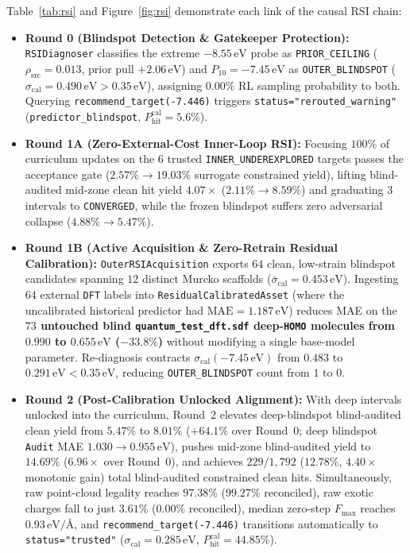 \documentclass[11pt,a4paper]{article}
\begin{document}
Table~\ref{tab:rsi} and Figure~\ref{fig:rsi} demonstrate each link of the causal RSI chain:
\begin{itemize}[leftmargin=1.5em,itemsep=2pt,topsep=2pt]
    \item \textbf{Round 0 (Blindspot Detection \& Gatekeeper Protection):} \texttt{RSIDiagnoser} classifies the extreme $-8.55\,\text{eV}$ probe as \texttt{PRIOR\_CEILING} ($\rho_{\text{src}} = 0.013$, prior pull $+2.06\,\text{eV}$) and $P_{10} = -7.45\,\text{eV}$ as \texttt{OUTER\_BLINDSPOT} ($\sigma_{\text{cal}} = 0.490\,\text{eV} > 0.35\,\text{eV}$), assigning $0.00\%$ RL sampling probability to both. Querying \texttt{recommend\_target(-7.446)} triggers \texttt{status="rerouted\_warning"} (\texttt{predictor\_blindspot}, $P_{\text{hit}}^{\text{cal}} = 5.6\%$).
    \item \textbf{Round 1A (Zero-External-Cost Inner-Loop RSI):} Focusing $100\%$ of curriculum updates on the $6$ trusted \texttt{INNER\_UNDEREXPLORED} targets passes the acceptance gate ($2.57\% \to 19.03\%$ surrogate constrained yield), lifting blind-audited mid-zone clean hit yield $4.07\times$ ($2.11\% \to 8.59\%$) and graduating $3$ intervals to \texttt{CONVERGED}, while the frozen blindspot suffers zero adversarial collapse ($4.88\% \to 5.47\%$).
    \item \textbf{Round 1B (Active Acquisition \& Zero-Retrain Residual Calibration):} \texttt{Outer\allowbreak RSI\allowbreak Acquisition} exports $64$ clean, low-strain blindspot candidates spanning $12$ distinct Murcko scaffolds ($\bar{\sigma}_{\text{cal}} = 0.453\,\text{eV}$). Ingesting $64$ external \texttt{DFT} labels into \texttt{Residual\allowbreak Calibrated\allowbreak Asset} (where the uncalibrated historical predictor had $\text{MAE} = 1.187\,\text{eV}$) reduces MAE on the \textbf{$73$ untouched blind \texttt{quantum\_test\_dft.sdf} deep-\texttt{HOMO} molecules from $0.990$ to $0.655\,\text{eV}$ ($-33.8\%$)} without modifying a single base-model parameter. Re-diagnosis contracts $\sigma_{\text{cal}}(-7.45\,\text{eV})$ from $0.483$ to $0.291\,\text{eV} < 0.35\,\text{eV}$, reducing \texttt{OUTER\_BLINDSPOT} count from $1$ to $0$.
    \item \textbf{Round 2 (Post-Calibration Unlocked Alignment):} With deep intervals unlocked into the curriculum, Round~2 elevates deep-blindspot blind-audited clean yield from $5.47\%$ to $8.01\%$ ($+64.1\%$ over Round~0; deep blindspot \texttt{Audit} MAE $1.030 \to 0.955\,\text{eV}$), pushes mid-zone blind-audited yield to $14.69\%$ ($6.96\times$ over Round~0), and achieves $229 / 1{,}792$ ($12.78\%$, $4.40\times$ monotonic gain) total blind-audited constrained clean hits. Simultaneously, raw point-cloud legality reaches $97.38\%$ ($99.27\%$ reconciled), raw exotic charges fall to just $3.61\%$ ($0.00\%$ reconciled), median zero-step $F_{\max}$ reaches $0.93\,\text{eV/\AA}$, and \texttt{recommend\_target(-7.446)} transitions automatically to \texttt{status="trusted"} ($\sigma_{\text{cal}} = 0.285\,\text{eV}$, $P_{\text{hit}}^{\text{cal}} = 44.85\%$).
\end{itemize}
\end{document}
